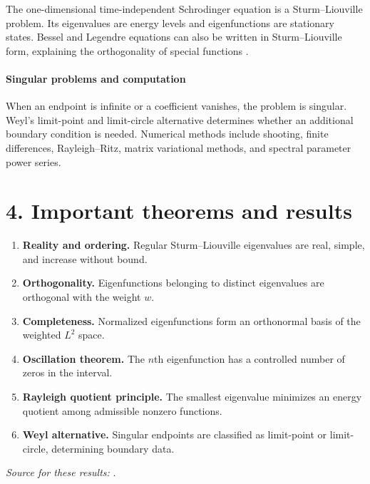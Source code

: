The one-dimensional time-independent Schrodinger equation is a Sturm--Liouville problem. Its eigenvalues are energy levels and eigenfunctions are stationary states. Bessel and Legendre equations can also be written in Sturm--Liouville form, explaining the orthogonality of special functions \cite{sturm_ref3}.

\paragraph{Singular problems and computation}
When an endpoint is infinite or a coefficient vanishes, the problem is singular. Weyl's limit-point and limit-circle alternative determines whether an additional boundary condition is needed. Numerical methods include shooting, finite differences, Rayleigh--Ritz, matrix variational methods, and spectral parameter power series.

\section*{4. Important theorems and results}
\begin{enumerate}[leftmargin=*,itemsep=0.35em]
\item \textbf{Reality and ordering.} Regular Sturm--Liouville eigenvalues are real, simple, and increase without bound.

\item \textbf{Orthogonality.} Eigenfunctions belonging to distinct eigenvalues are orthogonal with the weight $w$.

\item \textbf{Completeness.} Normalized eigenfunctions form an orthonormal basis of the weighted $L^2$ space.

\item \textbf{Oscillation theorem.} The $n$th eigenfunction has a controlled number of zeros in the interval.

\item \textbf{Rayleigh quotient principle.} The smallest eigenvalue minimizes an energy quotient among admissible nonzero functions.

\item \textbf{Weyl alternative.} Singular endpoints are classified as limit-point or limit-circle, determining boundary data.
\end{enumerate}
\noindent\emph{Source for these results:} \cite{sturm_ref1}.

